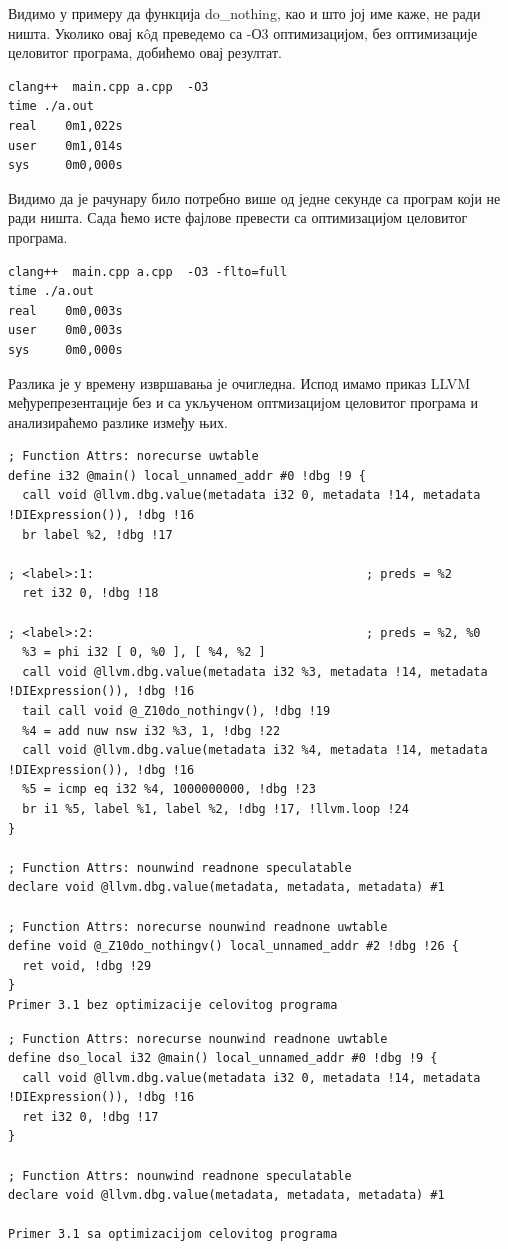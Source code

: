 \documentclass[12pt,oneside]{memoir}
\begin{document}
Видимо у примеру да функција  do{\_}nothing, као и што јој име каже, не ради ништа.
Уколико овај к\^{o}д преведемо са -О3 оптимизацијом, без оптимизације целовитог програма,
добићемо овај резултат.

\begin{lstlisting}
clang++  main.cpp a.cpp  -O3
time ./a.out 
real    0m1,022s
user    0m1,014s
sys     0m0,000s
\end{lstlisting}
Видимо да је рачунару било потребно више од једне секунде са програм који не ради ништа.
Сада ћемо исте фајлове превести са оптимизацијом целовитог програма.
\begin{lstlisting}
clang++  main.cpp a.cpp  -O3 -flto=full
time ./a.out 
real    0m0,003s
user    0m0,003s
sys     0m0,000s
\end{lstlisting}

Разлика је у времену извршавања је очигледна.
Испод имамо приказ LLVM међурепрезентације без и са укљученом оптмизацијом целовитог програма
и анализираћемо разлике између њих.
\begin{lstlisting}
; Function Attrs: norecurse uwtable
define i32 @main() local_unnamed_addr #0 !dbg !9 {
  call void @llvm.dbg.value(metadata i32 0, metadata !14, metadata !DIExpression()), !dbg !16
  br label %2, !dbg !17

; <label>:1:                                      ; preds = %2
  ret i32 0, !dbg !18

; <label>:2:                                      ; preds = %2, %0
  %3 = phi i32 [ 0, %0 ], [ %4, %2 ]
  call void @llvm.dbg.value(metadata i32 %3, metadata !14, metadata !DIExpression()), !dbg !16
  tail call void @_Z10do_nothingv(), !dbg !19
  %4 = add nuw nsw i32 %3, 1, !dbg !22
  call void @llvm.dbg.value(metadata i32 %4, metadata !14, metadata !DIExpression()), !dbg !16
  %5 = icmp eq i32 %4, 1000000000, !dbg !23
  br i1 %5, label %1, label %2, !dbg !17, !llvm.loop !24
}

; Function Attrs: nounwind readnone speculatable
declare void @llvm.dbg.value(metadata, metadata, metadata) #1

; Function Attrs: norecurse nounwind readnone uwtable
define void @_Z10do_nothingv() local_unnamed_addr #2 !dbg !26 {
  ret void, !dbg !29
}
Primer 3.1 bez optimizacije celovitog programa
\end{lstlisting}


\begin{lstlisting}
; Function Attrs: norecurse nounwind readnone uwtable
define dso_local i32 @main() local_unnamed_addr #0 !dbg !9 {
  call void @llvm.dbg.value(metadata i32 0, metadata !14, metadata !DIExpression()), !dbg !16
  ret i32 0, !dbg !17
}

; Function Attrs: nounwind readnone speculatable
declare void @llvm.dbg.value(metadata, metadata, metadata) #1

Primer 3.1 sa optimizacijom celovitog programa
\end{lstlisting}
\end{document}
